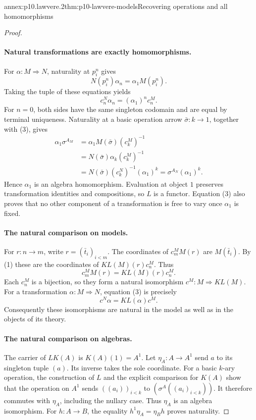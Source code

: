 \begin{annexitem}{annex:p10.lawvere.2}{thm:p10-lawvere-models}{Recovering operations and all homomorphisms}
\begin{proof}
\paragraph{Natural transformations are exactly homomorphisms.}
For \(\alpha:M\Rightarrow N\), naturality at \(p_i^n\) gives
\[
                        N(p_i^n)\alpha_n=\alpha_1 M(p_i^n).
\]
Taking the tuple of these equations yields
\[
                         c_n^N\alpha_n=(\alpha_1)^n c_n^M.
                                                                  \tag{3}
\]
For \(n=0\), both sides have the same singleton codomain and
are equal by terminal uniqueness.
Naturality at a basic operation arrow \(\bar\sigma:k\to1\),
together with (3), gives
\[
 \begin{aligned}
 \alpha_1\sigma^{A_M}
   &=\alpha_1 M(\bar\sigma)(c_k^M)^{-1}\\
   &=N(\bar\sigma)\alpha_k(c_k^M)^{-1}\\
   &=N(\bar\sigma)(c_k^N)^{-1}(\alpha_1)^k
    =\sigma^{A_N}(\alpha_1)^k.
 \end{aligned}
\]
Hence \(\alpha_1\) is an algebra homomorphism.
Evaluation at object \(1\) preserves transformation identities
and compositions, so \(L\) is a functor.
Equation (3) also proves that no other component of a
transformation is free to vary once \(\alpha_1\) is fixed.

\paragraph{The natural comparison on models.}
For \(r:n\to m\), write \(r=(\bar t_i)_{i<m}\).
The coordinates of \(c_m^M M(r)\) are \(M(\bar t_i)\).
By (1) these are the coordinates of
\(K L(M)(r)c_n^M\).
Thus
\[
                         c_m^M M(r)=K L(M)(r)c_n^M.
                                                                  \tag{4}
\]
Each \(c_n^M\) is a bijection, so they form a natural
isomorphism \(c^M:M\Rightarrow KL(M)\).
For a transformation \(\alpha:M\Rightarrow N\), equation (3)
is precisely
\[
                         c^N\alpha=KL(\alpha)c^M.
\]
Consequently these isomorphisms are natural in the model as
well as in the objects of its theory.

\paragraph{The natural comparison on algebras.}
The carrier of \(LK(A)\) is \(K(A)(1)=A^1\).
Let \(\eta_A:A\to A^1\) send \(a\) to its singleton tuple
\((a)\).  Its inverse takes the sole coordinate.
For a basic \(k\)-ary operation, the construction of \(L\)
and the explicit comparison for \(K(A)\) show that the
operation on \(A^1\) sends \(((a_i))_{i<k}\) to
\((\sigma^A((a_i)_{i<k}))\).
It therefore commutes with \(\eta_A\), including the
nullary case.  Thus \(\eta_A\) is an algebra isomorphism.
For \(h:A\to B\), the equality
\(h^1\eta_A=\eta_B h\) proves naturality.


\end{proof}
\end{annexitem}
